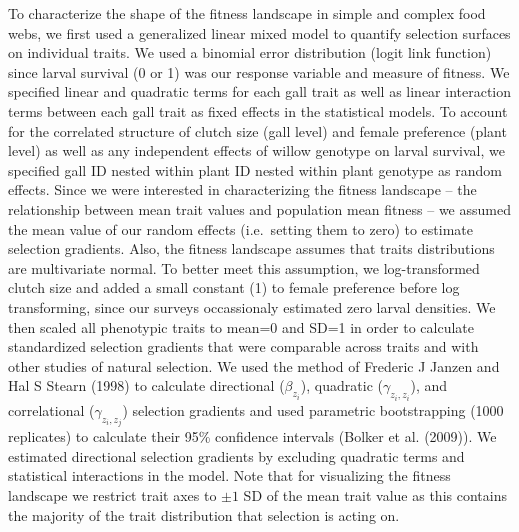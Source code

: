 \documentclass[]{elsarticle} %
\begin{document}
To characterize the shape of the fitness landscape in simple and complex
food webs, we first used a generalized linear mixed model to quantify
selection surfaces on individual traits. We used a binomial error
distribution (logit link function) since larval survival (0 or 1) was
our response variable and measure of fitness. We specified linear and
quadratic terms for each gall trait as well as linear interaction terms
between each gall trait as fixed effects in the statistical models. To
account for the correlated structure of clutch size (gall level) and
female preference (plant level) as well as any independent effects of
willow genotype on larval survival, we specified gall ID nested within
plant ID nested within plant genotype as random effects. Since we were
interested in characterizing the fitness landscape -- the relationship
between mean trait values and population mean fitness -- we assumed the
mean value of our random effects (i.e.~setting them to zero) to estimate
selection gradients. Also, the fitness landscape assumes that traits
distributions are multivariate normal. To better meet this assumption,
we log-transformed clutch size and added a small constant (1) to female
preference before log transforming, since our surveys occassionaly
estimated zero larval densities. We then scaled all phenotypic traits to
mean=0 and SD=1 in order to calculate standardized selection gradients
that were comparable across traits and with other studies of natural
selection. We used the method of Frederic J Janzen and Hal S Stearn
(1998) to calculate directional (\(\beta_{z_i}\)), quadratic
(\(\gamma_{z_i,z_i}\)), and correlational (\(\gamma_{z_i,z_j}\))
selection gradients and used parametric bootstrapping (1000 replicates)
to calculate their 95\% confidence intervals (Bolker et al. (2009)). We
estimated directional selection gradients by excluding quadratic terms
and statistical interactions in the model. Note that for visualizing the
fitness landscape we restrict trait axes to \(\pm 1\) SD of the mean
trait value as this contains the majority of the trait distribution that
selection is acting on.
\end{document}
